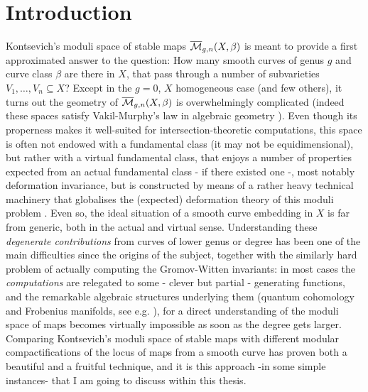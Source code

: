 

\chapter*{Introduction}
Kontsevich's moduli space of stable maps $\overline{\mathcal{M}}_{g,n}(X,\beta)$ \cite{KON} is meant to provide a first approximated answer to the question: How many smooth curves of genus $g$ and curve class $\beta$ are there in $X$, that pass through a number of subvarieties $V_1,\ldots,V_n\subseteq X$? Except in the $g=0$, $X$ homogeneous case (and few others), it turns out the geometry of $\overline{\mathcal{M}}_{g,n}(X,\beta)$ is overwhelmingly complicated (indeed these spaces satisfy Vakil-Murphy's law in algebraic geometry \cite{VakilMurphy}). Even though its properness makes it well-suited for intersection-theoretic computations, this space is often not endowed with a fundamental class (it may not be equidimensional), but rather with a virtual fundamental class, that enjoys a number of properties expected from an actual fundamental class - if there existed one -, most notably deformation invariance, but is constructed by means of a rather heavy technical machinery that globalises the (expected) deformation theory of this moduli problem \cites{LiTian,BF}. Even so, the ideal situation of a smooth curve embedding in $X$ is far from generic, both in the actual and virtual sense. Understanding these \emph{degenerate contributions} from curves of lower genus or degree has been one of the main difficulties since the origins of the subject, together with the similarly hard problem of actually computing the Gromov-Witten invariants: in most cases the \emph{computations} are relegated to some - clever but partial - generating functions, and the remarkable algebraic structures underlying them (quantum cohomology and Frobenius manifolds, see e.g. \cite{ManinFrobenius}), for a direct understanding of the moduli space of maps becomes virtually impossible as soon as the degree gets larger. Comparing Kontsevich's moduli space of stable maps with different modular compactifications of the locus of maps from a smooth curve has proven both a beautiful and a fruitful technique, and it is this approach -in some simple instances- that I am going to discuss within this thesis.

